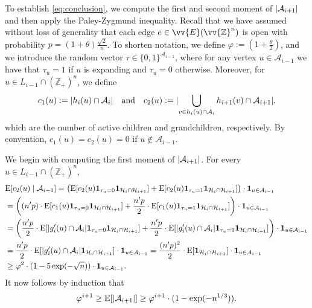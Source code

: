 \documentclass[11pt]{article}
\newcommand{\Z}{\mathbb{Z}}
\newcommand{\A}{\mathcal{A}}
\DeclarePairedDelimiter{\abs}{\lvert}{\rvert}
\theoremstyle{remark}
\begin{document}
    To establish \eqref{eq:conclusion}, we compute the first and second moment of $\abs{\A_{i+1}}$ and then apply the Paley-Zygmund inequality. Recall that we have assumed without loss of generality that each edge $e \in \vv{E}(\vv{\Z}^n)$ is open with probability $p=(1 + \theta)\frac{\sqrt{2}}{n}$. To shorten notation, we define $\varphi := (1 + \frac{\theta}{2})$, and we introduce the random vector $\tau \in \{0,1\}^{\A_{i-1}}$, where for any vertex $u \in \A_{i-1}$ we have that $\tau_u = 1$ if $u$ is expanding and $\tau_u = 0$ otherwise. Moreover, for $u \in L_{i-1} \cap (\Z_+)^n$, we define 
    \begin{equation}
        c_1(u) := \abs{h_i(u) \cap \A_i}\quad \text{and} \quad c_2(u) := \abs{\bigcup_{v \in h_i(u) \cap \A_i} h_{i+1}(v) \cap \A_{i+1}}, 
    \end{equation}
    which are the number of active children and grandchildren, respectively. By convention, $c_1(u)=c_2(u)=0$ if $u \notin \A_{i-1}$.
    
    We begin with computing the first moment of $\abs{\A_{i+1}}$. For every $u \in L_{i-1} \cap (\Z_+)^n$,
    \begin{align} 
        &\mathrm E[c_2(u) \mid \A_{i-1}] = \left(\mathrm E[c_2(u) \mathbf{1}_{\tau_u = 0} \mathbf{1}_{\mathcal{H}_i \cap \mathcal{H}_{i+1}}]  + \mathrm E[c_2(u) \mathbf{1}_{\tau_u = 1} \mathbf{1}_{\mathcal{H}_i \cap \mathcal{H}_{i+1}}] \right) \cdot \mathbf{1}_{u \in \A_{i-1}} \\
        &= \left( (n'p) \cdot \mathrm E[ c_1(u) \mathbf{1}_{\tau_u = 0} \mathbf{1}_{\mathcal{H}_i \cap \mathcal{H}_{i+1}} ]  + \frac{n'p}{2} \cdot \mathrm E[c_1(u) \mathbf{1}_{\tau_u = 1} \mathbf{1}_{\mathcal{H}_i \cap \mathcal{H}_{i+1}} ] \right) \cdot \mathbf{1}_{u \in \A_{i-1}} \\
        &= \left(\frac{n'p}{2}  \cdot \mathrm E[ \abs{g'_i(u) \cap \A_i} \mathbf{1}_{\tau_u = 0} \mathbf{1}_{\mathcal{H}_i \cap \mathcal{H}_{i+1}} ]  + \frac{n'p}{2} \cdot \mathrm E[\abs{g'_i(u) \cap \A_i} \mathbf{1}_{\tau_u = 1} \mathbf{1}_{\mathcal{H}_i \cap \mathcal{H}_{i+1}} ] \right) \cdot \mathbf{1}_{u \in \A_{i-1}} \\ 
        &= \frac{n'p}{2}  \cdot \mathrm E[ \abs{g'_i(u) \cap \A_i} \mathbf{1}_{\mathcal{H}_i \cap \mathcal{H}_{i+1}}] \cdot \mathbf{1}_{u \in \A_{i-1}}  = \frac{(n'p)^2}{2}  \cdot \mathrm E[\mathbf{1}_{\mathcal{H}_i \cap \mathcal{H}_{i+1}} ] \cdot \mathbf{1}_{u \in \A_{i-1}}  \\
        & \ge \varphi^2 \cdot (1-5\exp(-\sqrt{n})) \cdot  \mathbf{1}_{u \in \A_{i-1}} .
    \end{align}
    It now follows by induction that 
    \begin{equation}
        \varphi^{i+1} \ge \mathrm E[ \abs{\A_{i+1}}] \ge \varphi^{i+1} \cdot (1-\exp(-n^{1/3})) .
    \end{equation}
\end{document}
